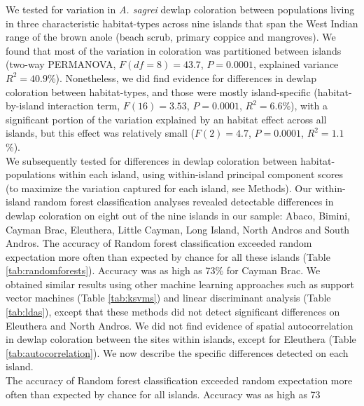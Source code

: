 
We tested for variation in \textit{A. sagrei} dewlap coloration between populations living in three characteristic habitat-types across nine islands that span the West Indian range of the brown anole (beach scrub, primary coppice and mangroves). We found that most of the variation in coloration was partitioned between islands (two-way PERMANOVA, $F(df = 8) = 43.7$, $P = 0.0001$, explained variance $R^2 = 40.9$\%). Nonetheless, we did find evidence for differences in dewlap coloration between habitat-types, and those were mostly island-specific (habitat-by-island interaction term, $F(16) = 3.53$, $P = 0.0001$, $R^2 = 6.6$\%), with a significant portion of the variation explained by an habitat effect across all islands, but this effect was relatively small ($F(2) = 4.7$, $P = 0.0001$, $R^2 = 1.1$\%).\\

We subsequently tested for differences in dewlap coloration between habitat-populations within each island, using within-island principal component scores (to maximize the variation captured for each island, see Methods). Our within-island random forest classification analyses revealed detectable differences in dewlap coloration on eight out of the nine islands in our sample: Abaco, Bimini, Cayman Brac, Eleuthera, Little Cayman, Long Island, North Andros and South Andros. The accuracy of Random forest classification exceeded random expectation more often than expected by chance for all these islands (Table \ref{tab:randomforests}). Accuracy was as high as 73\% for Cayman Brac. We obtained similar results using other machine learning approaches such as support vector machines (Table \ref{tab:ksvms}) and linear discriminant analysis (Table \ref{tab:ldas}), except that these methods did not detect significant differences on Eleuthera and North Andros. We did not find evidence of spatial autocorrelation in dewlap coloration between the sites within islands, except for Eleuthera (Table \ref{tab:autocorrelation}). We now describe the specific differences detected on each island.\\

The accuracy of Random forest classification exceeded random expectation more often than expected by chance for all islands. Accuracy was as high as 73%


